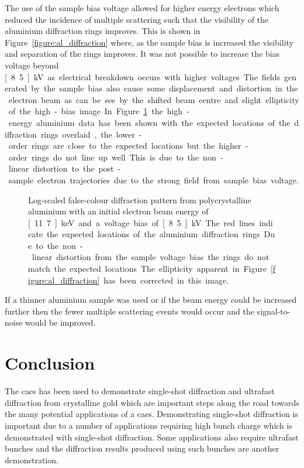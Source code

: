The use of the sample bias voltage allowed for higher energy electrons which reduced the incidence of multiple scattering such that the visibility of the aluminium diffraction rings improves.
This is shown in Figure~\ref{figure:al_diffraction} where, as the sample bias is increased the visibility and separation of the rings improves.
It was not possible to increase the bias voltage beyond \unit[8.5]{kV} as electrical breakdown occurs with higher voltages.
The fields generated by the sample bias also cause some displacement and distortion in the electron beam as can be see by the shifted beam centre and slight ellipticity of the high-bias image.

In Figure~\ref{figure:al_diffraction_rings} the high-energy aluminium data has been shown with the expected locations of the diffraction rings overlaid, the lower-order rings are close to the expected locations but the higher-order rings do not line up well.
This is due to the non-linear distortion to the post-sample electron trajectories due to the strong field from sample bias voltage.

\begin{figure}
    \center
    
    \caption[Diffraction pattern from aluminium demonstrating the distortion from the voltage bias.]{Log-scaled false-colour diffraction pattern from polycrystalline aluminium with an initial electron beam energy of \unit[11.7]{keV} and a voltage bias of \unit[8.5]{kV}. The red lines indicate the expected locations of the aluminium diffraction rings. Due to the non-linear distortion from the sample voltage bias the rings do not match the expected locations. The ellipticity apparent in Figure~\ref{figure:al_diffraction} has been corrected in this image.}
    \label{figure:al_diffraction_rings}
\end{figure}

If a thinner aluminium sample was used or if the beam energy could be increased further then the fewer multiple scattering events would occur and the signal-to-noise would be improved.

\section{Conclusion}

The \gls{caes} has been used to demonstrate single-shot diffraction and ultrafast diffraction from crystalline gold which are important steps along the road towards the many potential applications of a \gls{caes}.
Demonstrating single-shot diffraction is important due to a number of applications requiring high bunch charge which is demonstrated with single-shot diffraction.
Some applications also require ultrafast bunches and the diffraction results produced using such bunches are another demonstration.